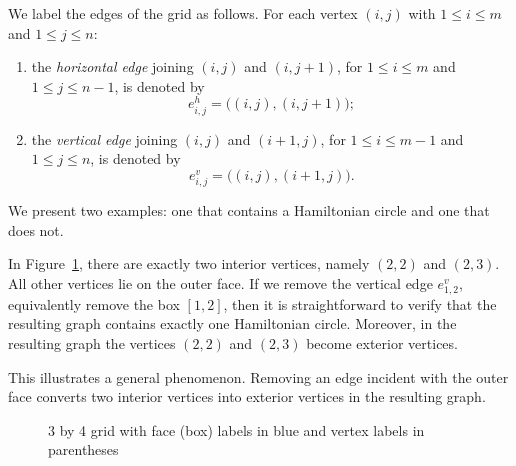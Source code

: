 \documentclass[12pt]{amsart}
\theoremstyle{theorem}%
\theoremstyle{definition}%
\begin{document}
We label the edges of the grid as follows.  
For each vertex $(i,j)$ with $1 \le i \le m$ and $1 \le j \le n$:

\begin{enumerate}
 

\item the \emph{horizontal edge} joining $(i,j)$ and $(i,j+1)$,
for $1 \le i \le m$ and $1 \le j \le n-1$,
is denoted by
\[
e^h_{i,j}=\big((i,j),(i,j+1)\big);
\]

\item the \emph{vertical edge} joining $(i,j)$ and $(i+1,j)$,
for $1 \le i \le m-1$ and $1 \le j \le n$,
is denoted by
\[
e^v_{i,j}=\big((i,j),(i+1,j)\big).
\]
\end{enumerate}


We present two examples: one that contains a Hamiltonian circle and one that does not.

In Figure~\ref{3by4}, there are exactly two interior vertices, namely $(2,2)$ and $(2,3)$. 
All other vertices lie on the outer face.
If we remove the vertical edge $e^{v}_{1,2}$, equivalently remove the box $[1,2]$, 
then it is straightforward to verify that the resulting graph contains exactly one Hamiltonian circle.
Moreover, in the resulting graph the vertices $(2,2)$ and $(2,3)$ become exterior vertices.

This illustrates a general phenomenon.
Removing an edge incident with the outer face converts two interior vertices into exterior vertices
in the resulting graph.






 




\begin{figure}[H]
\centering
{}
\caption{3 by 4 grid with face (box) labels in blue and vertex labels in parentheses}
\label{3by4}
\end{figure}
\end{document}
